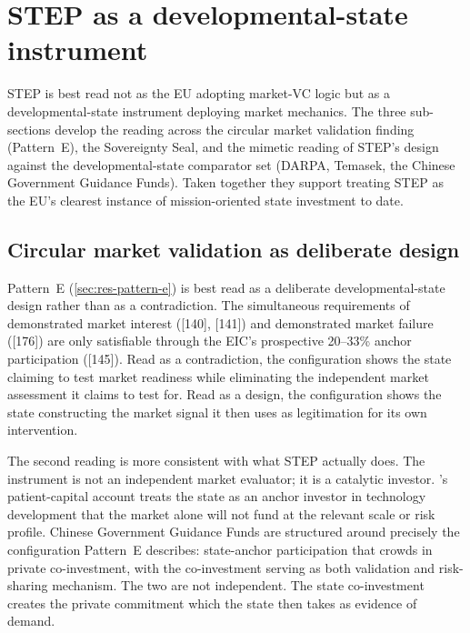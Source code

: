 \section{STEP as a developmental-state instrument}
\label{sec:disc-step}

STEP is best read not as the EU adopting market-VC logic but as a
developmental-state instrument deploying market mechanics. The three
sub-sections develop the reading across the circular market validation
finding (Pattern~E), the Sovereignty Seal, and the mimetic reading of
STEP's design against the developmental-state comparator set (DARPA,
Temasek, the Chinese Government Guidance Funds). Taken together they
support treating STEP as the EU's clearest instance of
mission-oriented state investment to date.

\subsection{Circular market validation as deliberate design}
\label{sec:disc-step-circular}

Pattern~E (\cref{sec:res-pattern-e}) is best read as a deliberate
developmental-state design rather than as a contradiction. The
simultaneous requirements of demonstrated market interest ([140],
[141]) and demonstrated market failure ([176]) are only satisfiable
through the EIC's prospective 20--33\% anchor participation ([145]).
Read as a contradiction, the configuration shows the state claiming to
test market readiness while eliminating the independent market
assessment it claims to test for. Read as a design, the configuration
shows the state constructing the market signal it then uses as
legitimation for its own intervention.

The second reading is more consistent with what STEP actually does.
The instrument is not an independent market evaluator; it is a
catalytic investor. \textcite{mazzucato2013entrepreneurial}'s patient-capital
account treats the state as an anchor investor in technology
development that the market alone will not fund at the relevant scale
or risk profile. Chinese Government Guidance Funds are structured
around precisely the configuration Pattern~E describes: state-anchor
participation that crowds in private co-investment, with the
co-investment serving as both validation and risk-sharing mechanism.
The two are not independent. The state co-investment creates the
private commitment which the state then takes as evidence of demand.

